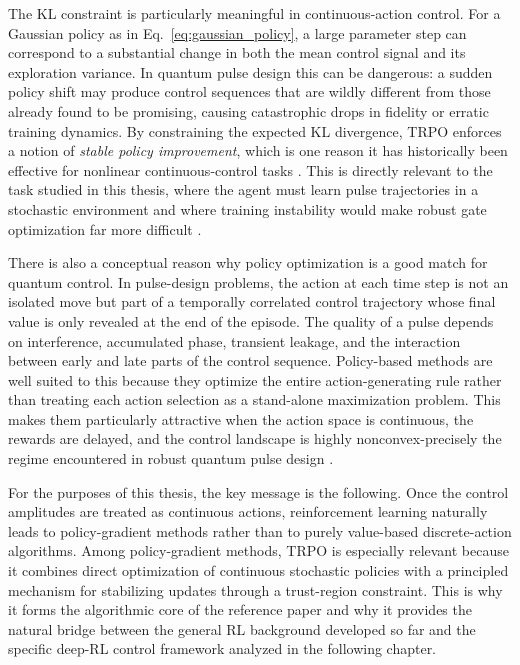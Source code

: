 The KL constraint is particularly meaningful in continuous-action control. For a Gaussian policy as in Eq.~\eqref{eq:gaussian_policy}, a large parameter step can correspond to a substantial change in both the mean control signal and its exploration variance. In quantum pulse design this can be dangerous: a sudden policy shift may produce control sequences that are wildly different from those already found to be promising, causing catastrophic drops in fidelity or erratic training dynamics. By constraining the expected KL divergence, TRPO enforces a notion of \emph{stable policy improvement}, which is one reason it has historically been effective for nonlinear continuous-control tasks \cite{Schulman2015}. This is directly relevant to the task studied in this thesis, where the agent must learn pulse trajectories in a stochastic environment and where training instability would make robust gate optimization far more difficult \cite{Niu2019}.

There is also a conceptual reason why policy optimization is a good match for quantum control. In pulse-design problems, the action at each time step is not an isolated move but part of a temporally correlated control trajectory whose final value is only revealed at the end of the episode. The quality of a pulse depends on interference, accumulated phase, transient leakage, and the interaction between early and late parts of the control sequence. Policy-based methods are well suited to this because they optimize the entire action-generating rule rather than treating each action selection as a stand-alone maximization problem. This makes them particularly attractive when the action space is continuous, the rewards are delayed, and the control landscape is highly nonconvex-precisely the regime encountered in robust quantum pulse design \cite{Giannelli2022,Niu2019}.

For the purposes of this thesis, the key message is the following. Once the control amplitudes are treated as continuous actions, reinforcement learning naturally leads to policy-gradient methods rather than to purely value-based discrete-action algorithms. Among policy-gradient methods, TRPO is especially relevant because it combines direct optimization of continuous stochastic policies with a principled mechanism for stabilizing updates through a trust-region constraint. This is why it forms the algorithmic core of the reference paper and why it provides the natural bridge between the general RL background developed so far and the specific deep-RL control framework analyzed in the following chapter.



